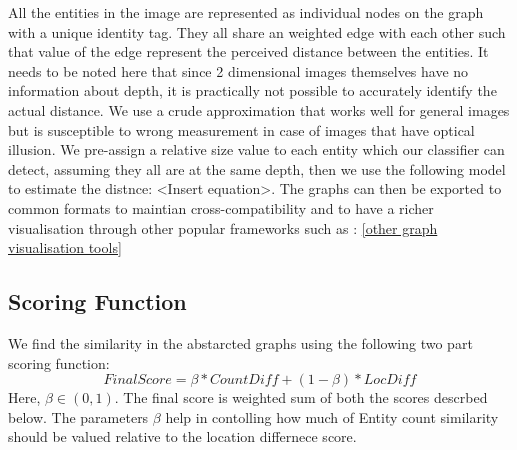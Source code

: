 \documentclass[conference]{IEEEtran}
\begin{document}
{    All the entities in the image are represented as individual nodes on the graph with a unique identity tag. They all share an weighted edge with each other such that value of the edge represent the perceived distance between the entities. It needs to be noted here that since 2 dimensional images themselves have no information about depth, it is practically not possible to accurately identify the actual distance. We use a crude approximation that works well for general images but is susceptible to wrong measurement in case of images that have optical illusion. We pre-assign a relative size value to each entity which our classifier can detect, assuming they all are at the same depth, then we use the following model to estimate the distnce: <Insert equation>. The graphs can then be exported to common formats to maintian cross-compatibility and to have a richer visualisation through other popular frameworks such as : \ref{other graph visualisation tools}
    
    \subsection{Scoring Function}
    We find the similarity in the abstarcted graphs using the following two part scoring function:     
        \begin{equation}
        FinalScore = \beta * CountDiff + (1 - \beta)*LocDiff
        \end{equation}
        Here, $\beta \in (0,1)$. The final score is weighted sum of both the scores descrbed below. The parameters $\beta$ help in contolling how much of Entity count similarity should be valued relative to the location differnece score.
}
\end{document}

